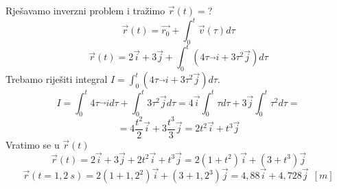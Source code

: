 

Rješavamo inverzni problem i tražimo $\vec{r}(t)=$?
$$
\vec{r}(t)=\vec{r_0}+\int_0^t \vec{v}(\tau)d\tau
$$
$$
\vec{r}(t)=2\vec{i}+3\vec{j}+\int_0^t(4\tau\vec{}i+3\tau^2\vec{j})d\tau
$$
Trebamo riješiti integral $I=\int_0^t(4\tau\vec{}i+3\tau^2\vec{j})d\tau$.
$$
I=\int_0^t 4\tau\vec{}i d\tau + \int_0^t 3\tau^2\vec{j} d\tau= 4\vec{i}\int_0^t \tau d\tau + 3\vec{j}\int_0^t \tau^2d\tau=
$$
$$
=4\frac{t^2}{2}\vec{i}+3\frac{t^3}{3}\vec{j}=2t^2 \vec{i}+t^3\vec{j}
$$
Vratimo se u $\vec{r}(t)$
$$
\vec{r}(t)=2\vec{i}+3\vec{j}+2t^2 \vec{i}+t^3\vec{j}=2(1+t^2)\vec{i}+(3+t^3)\vec{j}
$$
$$
\vec{r}(t=1,2\ s)=2(1+1,2^2)\vec{i}+(3+1,2^3)\vec{j}=4,88\vec{i}+4,728\vec{j}\ \ [m]
$$


 
 
